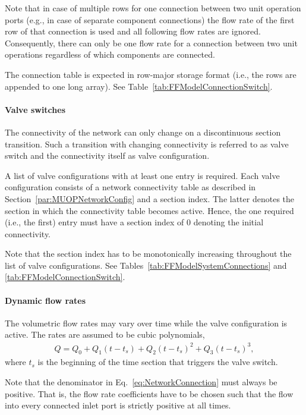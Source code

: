 Note that in case of multiple rows for one connection between two unit operation ports (e.g., in case of separate component connections) the flow rate of the first row of that connection is used and all following flow rates are ignored.
Consequently, there can only be one flow rate for a connection between two unit operations regardless of which components are connected.

The connection table is expected in row-major storage format (i.e., the rows are appended to one long array).
See Table~\ref{tab:FFModelConnectionSwitch}.

\paragraph{Valve switches}
\label{par:MUOPNetworkValveSwitches}

The connectivity of the network can only change on a discontinuous section transition.
Such a transition with changing connectivity is referred to as valve switch and the connectivity itself as valve configuration. 

A list of valve configurations with at least one entry is required.
Each valve configuration consists of a network connectivity table as described in Section~\ref{par:MUOPNetworkConfig} and a section index.
The latter denotes the section in which the connectivity table becomes active.
Hence, the one required (i.e., the first) entry must have a section index of $0$ denoting the initial connectivity.

Note that the section index has to be monotonically increasing throughout the list of valve configurations.
See Tables~\ref{tab:FFModelSystemConnections} and \ref{tab:FFModelConnectionSwitch}.

\paragraph{Dynamic flow rates}
\label{par:MUOPNetworkDynamicFlowRates}

The volumetric flow rates may vary over time while the valve configuration is active.
The rates are assumed to be cubic polynomials,
\begin{align*}
	Q = Q_0 + Q_1(t - t_s) + Q_2(t-t_s)^2 + Q_3(t-t_s)^3,
\end{align*}
where $t_s$ is the beginning of the time section that triggers the valve switch.

Note that the denominator in Eq.~\ref{eq:NetworkConnection} must always be positive.
That is, the flow rate coefficients have to be chosen such that the flow into every connected inlet port is strictly positive at all times.

